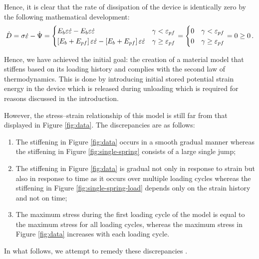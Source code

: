 \documentclass{article}
\begin{document}
Hence, it is clear that the rate of dissipation of the device is identically zero by the following mathematical development:
\begin{equation}
	\dot{D} = \sigma \dot{\varepsilon} - \dot{\Psi} = \begin{cases}
		E_{b}\varepsilon \dot{\varepsilon} - E_{b}\varepsilon \dot{\varepsilon}  & \gamma < \varepsilon_{pf}\\
		\left[E_{b} + E_{pf}\right]\varepsilon \dot{\varepsilon} - \left[E_{b} + E_{pf}\right]\varepsilon \dot{\varepsilon}  & \gamma \geq \varepsilon_{pf}
	\end{cases} = \begin{cases}
	0  & \gamma < \varepsilon_{pf}\\
	0  & \gamma \geq \varepsilon_{pf}
\end{cases} =0 \geq 0\,.
\end{equation}

Hence, we have achieved the initial goal: the creation of a material model that stiffens based on its loading history and complies with the second law of thermodynamics. This is done by introducing initial stored potential strain energy in the device which is released during unloading which is required for reasons discussed in the introduction.

However, the stress--strain relationship of this model is still far from that displayed in Figure \ref{fig:data}. The discrepancies are as follows:
\begin{enumerate}
	\item The stiffening in Figure \ref{fig:data} occurs in a smooth gradual manner whereas the stiffening in Figure \ref{fig:single-spring} consists of a large single jump;
	\item The stiffening in Figure \ref{fig:data} is gradual not only in response to strain but also in response to time as it occurs over multiple loading cycles whereas the stiffening in Figure \ref{fig:single-spring-load} depends only on the strain history and not on time;
	\item The maximum stress during the first loading cycle of the model is equal to the maximum stress for all loading cycles, whereas the maximum stress in Figure \ref{fig:data} increases with each loading cycle.
\end{enumerate}
In what follows, we attempt to remedy these discrepancies .
\end{document}
